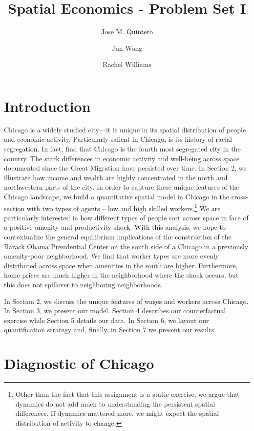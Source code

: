\documentclass[12pt]{article}
\title{Spatial Economics - Problem Set I}
\author{Jose M. Quintero \and Jun Wong \and Rachel Williams}
\begin{document}
\maketitle

\section{Introduction}



Chicago is a widely studied city---it is unique in its spatial distribution of people and economic activity. Particularly salient in Chicago, is its history of racial segregation. In fact, \citet{seg2021} find that Chicago is the fourth most segregated city in the country. The stark differences in economic activity and well-being across space documented since the Great Migration have persisted over time. In Section 2, we illustrate how income and wealth are highly concentrated in the north and northwestern parts of the city. In order to capture these unique features of the Chicago landscape, we build a quantitative spatial model in Chicago in the cross-section with two types of agents -- low and high skilled workers.\footnote{Other than the fact that this assignment is a static exercise, we argue that dynamics do not add much to understanding the persistent spatial differences. If dynamics mattered more, we might expect the spatial distribution of activity to change.} We are particularly interested in how different types of people sort across space in face of a positive amenity and productivity shock. With this analysis, we hope to contextualize the general equilibrium implications of the construction of the Barack Obama Presidential Center on the south side of a Chicago in a previously amenity-poor neighborhood. We find that worker types are more evenly distributed across space when amenities in the south are higher. Furthermore, home prices are much higher in the neighborhood where the shock occurs, but this does not spillover to neighboring neighborhoods.  


In Section 2, we discuss the unique features of wages and workers across Chicago. In Section 3, we present our model. Section 4 describes our counterfactual exercise while Section 5 details our data. In Section 6, we layout our quantification strategy and, finally, in Section 7 we present our results. 


\section{Diagnostic of Chicago}
\end{document}
